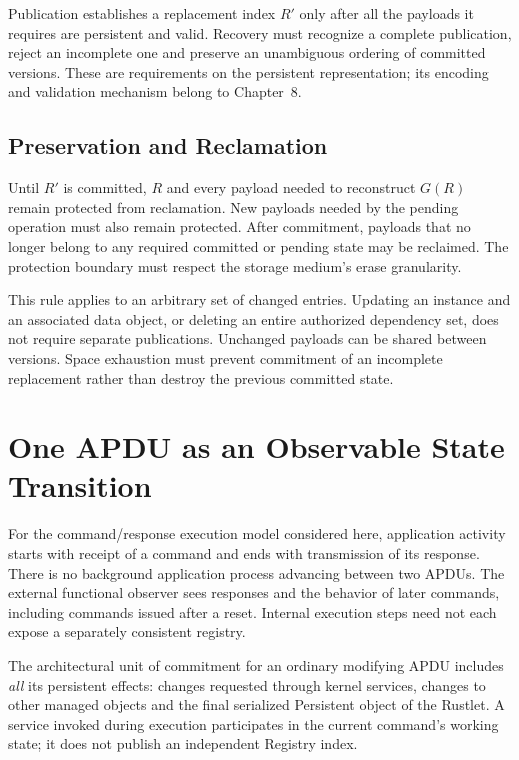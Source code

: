 Publication establishes a replacement index $R'$ only after all the payloads
it requires are persistent and valid. Recovery must recognize a complete
publication, reject an incomplete one and preserve an unambiguous ordering of
committed versions. These are requirements on the persistent representation;
its encoding and validation mechanism belong to Chapter~8.

\subsection{Preservation and Reclamation}
\label{subsec:persistence-recycling-rule}

Until $R'$ is committed, $R$ and every payload needed to reconstruct $G(R)$
remain protected from reclamation. New payloads needed by the pending
operation must also remain protected. After commitment, payloads that no
longer belong to any required committed or pending state may be reclaimed.
The protection boundary must respect the storage medium's erase granularity.

This rule applies to an arbitrary set of changed entries. Updating an instance
and an associated data object, or deleting an entire authorized dependency
set, does not require separate publications. Unchanged payloads can be shared
between versions. Space exhaustion must prevent commitment of an incomplete
replacement rather than destroy the previous committed state.

\section{One APDU as an Observable State Transition}
\label{sec:registry-architectural-requirements}
\label{subsec:persistence-commit-rule}

For the command/response execution model considered here, application activity
starts with receipt of a command and ends with transmission of its response.
There is no background application process advancing between two APDUs.
The external functional observer sees responses and the behavior of later
commands, including commands issued after a reset. Internal execution steps
need not each expose a separately consistent registry.

The architectural unit of commitment for an ordinary modifying APDU includes
\emph{all} its persistent effects: changes requested through kernel services,
changes to other managed objects and the final serialized Persistent object of the
Rustlet. A service invoked during execution participates in the current
command's working state; it does not publish an independent Registry index.

